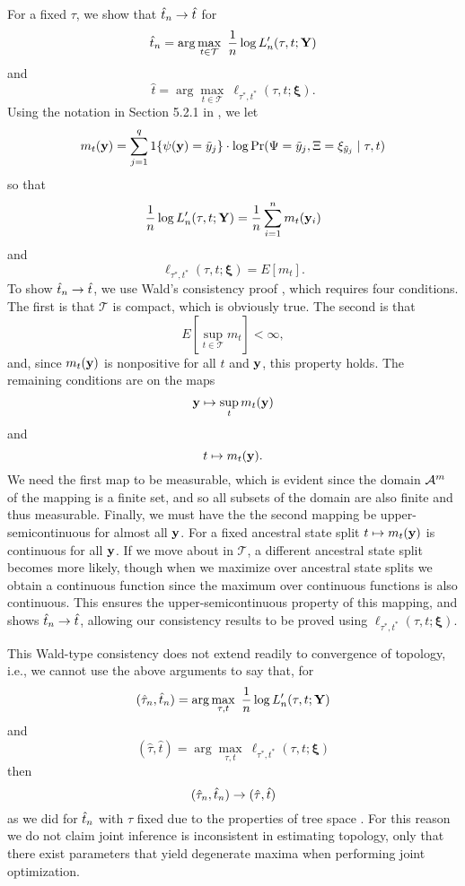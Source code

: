 For a fixed $\tau$, we show that $\hat{t}_n \rightarrow \hat{t}$ for
\[
\hat{t}_n = \arg\max_{t\in\mathcal{T}} \ \frac{1}{n}\log L_n'(\tau, t; \mathbf{Y})
\]
and
\[
\hat{t} = \arg\max_{t\in\mathcal{T}} \ \ell_{\tau^*,t^*}(\tau, t; \boldsymbol\xi).
\]
Using the notation in Section 5.2.1 in \citet{van1998asymptotic}, we let
\[
m_t(\mathbf{y}) = \sum_{j=1}^q 1\{\psi(\mathbf{y})=\tilde{y}_j\} \cdot \log \Pr(\Psi=\tilde{y}_j, \Xi=\xi_{\tilde{y}_j} \mid \tau, t)
\]
so that
\[
\frac{1}{n}\log L_n'(\tau, t; \mathbf{Y}) = \frac{1}{n} \sum_{i=1}^n m_t(\mathbf{y}_i)
\]
and
\[
\ell_{\tau^*,t^*}(\tau, t; \boldsymbol\xi) = E[m_t].
\]
To show $\hat{t}_n \rightarrow \hat{t}$, we use Wald's consistency proof \citep[p. 48, Theorem 5.14 of ][]{van1998asymptotic}, which requires four conditions.
The first is that $\mathcal{T}$ is compact, which is obviously true.
The second is that
\[
E\left[\sup_{t\in\mathcal{T}} m_t\right] < \infty,
\]
and, since $m_t(\mathbf{y})$ is nonpositive for all $t$ and $\mathbf{y}$, this property holds.
The remaining conditions are on the maps
\[
\mathbf{y} \mapsto \sup_t m_t(\mathbf{y})
\]
and
\[
t \mapsto m_t(\mathbf{y}).
\]
We need the first map to be measurable, which is evident since the domain $\mathcal{A}^m$ of the mapping is a finite set, and so all subsets of the domain are also finite and thus measurable.
Finally, we must have the the second mapping be upper-semicontinuous for almost all $\mathbf{y}$.
For a fixed ancestral state split $t \mapsto m_t(\mathbf{y})$ is continuous for all $\mathbf{y}$.
If we move about in $\mathcal{T}$, a different ancestral state split becomes more likely, though when we maximize over ancestral state splits we obtain a continuous function since the maximum over continuous functions is also continuous.
This ensures the upper-semicontinuous property of this mapping, and shows $\hat{t}_n \rightarrow \hat{t}$, allowing our consistency results to be proved using $\ell_{\tau^*,t^*}(\tau, t; \boldsymbol\xi)$.

This Wald-type consistency does not extend readily to convergence of topology, i.e., we cannot use the above arguments to say that, for
\[
(\hat{\tau}_n, \hat{t}_n) = \arg\max_{\tau, t} \ \frac{1}{n}\log L_n'(\tau, t; \mathbf{Y})
\]
and
\[
(\hat{\tau}, \hat{t}) = \arg\max_{\tau, t} \ \ell_{\tau^*,t^*}(\tau, t; \boldsymbol\xi)
\]
then
\[
(\hat{\tau}_n, \hat{t}_n) \rightarrow (\hat{\tau}, \hat{t})
\]
as we did for $\hat{t}_n$ with $\tau$ fixed due to the properties of tree space \citep{Yang1994}.
For this reason we do not claim joint inference is inconsistent in estimating topology, only that there exist parameters that yield degenerate maxima when performing joint optimization.

